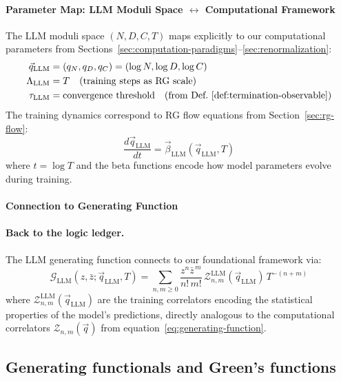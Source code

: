 \paragraph{Parameter Map: LLM Moduli Space $\leftrightarrow$ Computational Framework}
The LLM moduli space $(N, D, C, T)$ maps explicitly to our computational parameters from Sections~\ref{sec:computation-paradigms}--\ref{sec:renormalization}:
\begin{align}
\vec{q}_{\text{LLM}} &= (q_N, q_D, q_C) = (\log N, \log D, \log C) \label{eq:llm-q-map} \\
\Lambda_{\text{LLM}} &= T \quad \text{(training steps as RG scale)} \label{eq:llm-lambda-map} \\
\tau_{\text{LLM}} &= \text{convergence threshold} \quad \text{(from Def.~\ref{def:termination-observable})} \label{eq:llm-tau-map}
\end{align}
The training dynamics correspond to RG flow equations from Section~\ref{sec:rg-flow}:
\begin{equation}
\frac{d\vec{q}_{\text{LLM}}}{dt} = \vec{\beta}_{\text{LLM}}(\vec{q}_{\text{LLM}}, T) \label{eq:llm-rg-flow}
\end{equation}
where $t = \log T$ and the beta functions encode how model parameters evolve during training.

\paragraph{Connection to Generating Function}
\paragraph{Back to the logic ledger.} The LLM generating function connects to our foundational framework via:
\begin{equation}
\mathcal{G}_{\text{LLM}}(z, \bar{z}; \vec{q}_{\text{LLM}}, T) = \sum_{n,m\ge0}\frac{z^n\bar{z}^{\,m}}{n!\,m!}\,\mathcal{Z}_{n,m}^{\text{LLM}}(\vec{q}_{\text{LLM}})\,T^{-(n+m)} \label{eq:llm-generating-function}
\end{equation}
where $\mathcal{Z}_{n,m}^{\text{LLM}}(\vec{q}_{\text{LLM}})$ are the training correlators encoding the statistical properties of the model's predictions, directly analogous to the computational correlators $\mathcal{Z}_{n,m}(\vec{q})$ from equation~\eqref{eq:generating-function}.

\subsection{Generating functionals and Green's functions}
\label{sec:ZJ}


